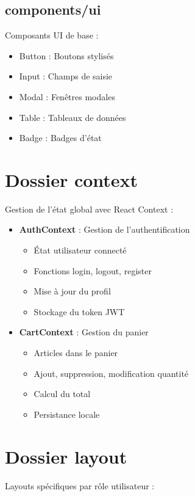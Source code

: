 \documentclass[12pt,a4paper]{report}
\begin{document}
\subsection{components/ui}

Composants UI de base :
\begin{itemize}[noitemsep]
    \item Button : Boutons stylisés
    \item Input : Champs de saisie
    \item Modal : Fenêtres modales
    \item Table : Tableaux de données
    \item Badge : Badges d'état
\end{itemize}

\section{Dossier context}

Gestion de l'état global avec React Context :

\begin{itemize}[noitemsep]
    \item \textbf{AuthContext} : Gestion de l'authentification
    \begin{itemize}[noitemsep]
        \item État utilisateur connecté
        \item Fonctions login, logout, register
        \item Mise à jour du profil
        \item Stockage du token JWT
    \end{itemize}
    \item \textbf{CartContext} : Gestion du panier
    \begin{itemize}[noitemsep]
        \item Articles dans le panier
        \item Ajout, suppression, modification quantité
        \item Calcul du total
        \item Persistance locale
    \end{itemize}
\end{itemize}

\section{Dossier layout}

Layouts spécifiques par rôle utilisateur :
\end{document}
